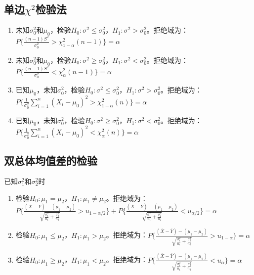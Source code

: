 \documentclass[a4paper,12pt]{ctexart}
\begin{document}
\subsection{单边$\chi^2$检验法}

\begin{enumerate}
	\item 未知$\sigma_0^2$和$\mu_0$，检验$H_0: \sigma^2 \leq \sigma_0^2$，$H_1: \sigma^2 > \sigma_0^2$。拒绝域为：$P\{\frac{(n-1)S^2}{\sigma_0^2} > \chi_{1-\alpha}^2(n-1)\} = \alpha$
	\item 未知$\sigma_0^2$和$\mu_0$，检验$H_0: \sigma^2 \geq \sigma_0^2$，$H_1: \sigma^2 < \sigma_0^2$。拒绝域为：$P\{\frac{(n-1)S^2}{\sigma_0^2} < \chi_{\alpha}^2(n-1)\} = \alpha$
	\item 已知$\mu_0$，未知$\sigma_0^2$，检验$H_0: \sigma^2 \leq \sigma_0^2$，$H_1: \sigma^2 > \sigma_0^2$。拒绝域为：$P\{\frac{1}{\sigma_0^2} \sum_{i=1}^n(X_i - \mu_0)^2 > \chi_{1-\alpha}^2(n)\} = \alpha$
	\item 已知$\mu_0$，未知$\sigma_0^2$，检验$H_0: \sigma^2 \geq \sigma_0^2$，$H_1: \sigma^2 < \sigma_0^2$。拒绝域为：$P\{\frac{1}{\sigma_0^2} \sum_{i=1}^n(X_i - \mu_0)^2 < \chi_{\alpha}^2(n)\} = \alpha$
\end{enumerate}

\subsection{双总体均值差的检验}

已知$\sigma_1^2$和$\sigma_2^2$时
\begin{enumerate}
	\item 检验$H_0: \mu_1 = \mu_2$，$H_1: \mu_1 \neq \mu_2$。拒绝域为：$P\{\frac{(\overline{X} - \overline{Y}) - (\mu_1 - \mu_2)}{\sqrt{\frac{\sigma_1^2}{n_1} + \frac{\sigma_2^2}{n_2}}} > u_{1-\alpha/2}\} + P\{\frac{(\overline{X} - \overline{Y}) - (\mu_1 - \mu_2)}{\sqrt{\frac{\sigma_1^2}{n_1} + \frac{\sigma_2^2}{n_2}}} < u_{\alpha/2}\} = \alpha$
	\item 检验$H_0: \mu_1 \leq \mu_2$，$H_1: \mu_1 > \mu_2$。拒绝域为：$P\{\frac{(\overline{X} - \overline{Y}) - (\mu_1 - \mu_2)}{\sqrt{\frac{\sigma_1^2}{n_1} + \frac{\sigma_2^2}{n_2}}} > u_{1-\alpha}\} = \alpha$
	\item 检验$H_0: \mu_1 \geq \mu_2$，$H_1: \mu_1 < \mu_2$。拒绝域为：$P\{\frac{(\overline{X} - \overline{Y}) - (\mu_1 - \mu_2)}{\sqrt{\frac{\sigma_1^2}{n_1} + \frac{\sigma_2^2}{n_2}}} < u_{\alpha}\} = \alpha$
\end{enumerate}
\end{document}
